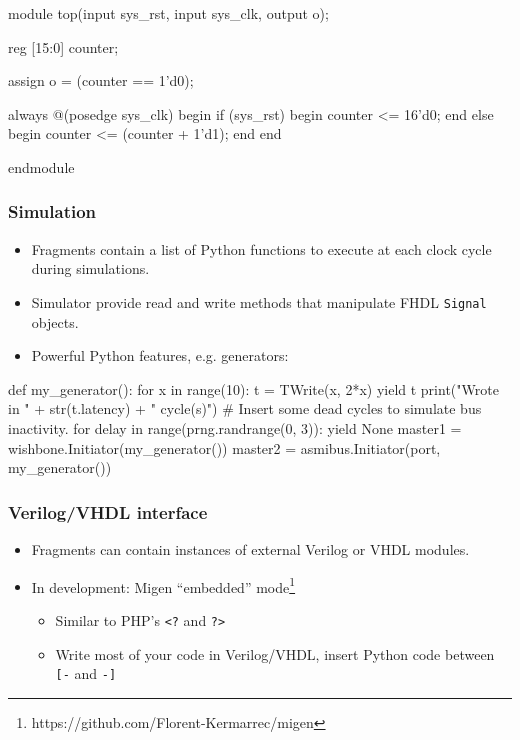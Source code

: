 \documentclass[serif,mathserif]{beamer}
\begin{document}
\begin{frame}[fragile]
\begin{verbatimtab}
module top(input sys_rst, input sys_clk, output o);

reg [15:0] counter;

assign o = (counter == 1'd0);

always @(posedge sys_clk) begin
        if (sys_rst) begin
                counter <= 16'd0;
        end else begin
                counter <= (counter + 1'd1);
        end
end

endmodule
\end{verbatimtab}
\end{frame}

\begin{frame}[fragile]
\frametitle{Simulation}
\begin{itemize}
\item Fragments contain a list of Python functions to execute at each clock cycle during simulations.
\item Simulator provide read and write methods that manipulate FHDL \verb!Signal! objects.
\item Powerful Python features, e.g. generators:
\end{itemize}
\begin{verbatimtab}
def my_generator():
        for x in range(10):
                t = TWrite(x, 2*x)
                yield t
                print("Wrote in " + str(t.latency) + " cycle(s)")
                # Insert some dead cycles to simulate bus inactivity.
                for delay in range(prng.randrange(0, 3)):
                        yield None
master1 = wishbone.Initiator(my_generator())
master2 = asmibus.Initiator(port, my_generator())
\end{verbatimtab}
\end{frame}

\begin{frame}[fragile]
\frametitle{Verilog/VHDL interface}
\begin{itemize}
\item Fragments can contain instances of external Verilog or VHDL modules.
\item In development: Migen ``embedded'' mode\footnote{https://github.com/Florent-Kermarrec/migen}
\begin{itemize}
\item Similar to PHP's \verb!<?! and \verb!?>!
\item Write most of your code in Verilog/VHDL, insert Python code between \verb![-! and \verb!-]!
\end{itemize}
\end{itemize}
\end{frame}
\end{document}
